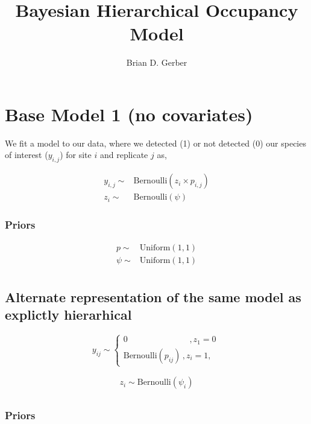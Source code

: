 \documentclass[12pt]{article}
\title{Bayesian Hierarchical Occupancy Model}
\author{Brian D. Gerber}
\begin{document}
\maketitle
\section{Base Model 1 (no covariates)}

\Large

We fit a model to our data, where we detected (1) or not detected (0) our species of interest ($y_{i,j}$) for site $i$ and replicate $j$ as,

\begin{align*}
y_{i,j}\sim& \text{Bernoulli}(z_{i} \times p_{i,j})\\
z_{i} \sim&  \text{Bernoulli}(\psi)
\end{align*}

\subsubsection{Priors}

\begin{align*}
p \sim& \text{Uniform}(1, 1)\\
\psi \sim& \text{Uniform}(1, 1)\\
\end{align*}


\pagebreak



\subsection{Alternate representation of the same model as explictly hierarhical}

\[y_{ij}\sim
	\begin{cases}
	0\hspace{88pt}, z_1=0\\
	\text{Bernoulli}(p_{ij}) \hspace{2pt}, z_i=1, \hspace{2pt}
	\end{cases}\
\]

\vspace{0.1in}
\begin{align}
z_i\sim 	\text{Bernoulli}(\psi_i)\\
\end{align}



\subsubsection{Priors}
\end{document}
